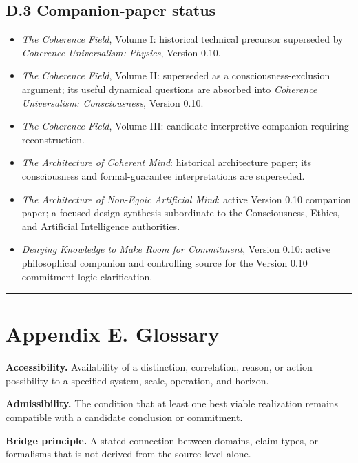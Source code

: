 \documentclass[
  11pt,
]{article}
\providecommand{\tightlist}{%
  \setlength{\itemsep}{0pt}\setlength{\parskip}{0pt}}
\begin{document}
\subsection{D.3 Companion-paper
status}\label{d.3-companion-paper-status}

\begin{itemize}
\tightlist
\item
  \emph{The Coherence Field}, Volume I: historical technical precursor
  superseded by \emph{Coherence Universalism: Physics}, Version 0.10.
\item
  \emph{The Coherence Field}, Volume II: superseded as a
  consciousness-exclusion argument; its useful dynamical questions are
  absorbed into \emph{Coherence Universalism: Consciousness}, Version
  0.10.
\item
  \emph{The Coherence Field}, Volume III: candidate interpretive
  companion requiring reconstruction.
\item
  \emph{The Architecture of Coherent Mind}: historical architecture
  paper; its consciousness and formal-guarantee interpretations are
  superseded.
\item
  \emph{The Architecture of Non-Egoic Artificial Mind}: active Version
  0.10 companion paper; a focused design synthesis subordinate to the
  Consciousness, Ethics, and Artificial Intelligence authorities.
\item
  \emph{Denying Knowledge to Make Room for Commitment}, Version 0.10:
  active philosophical companion and controlling source for the Version
  0.10 commitment-logic clarification.
\end{itemize}

\begin{center}\rule{0.5\linewidth}{0.5pt}\end{center}

\section{Appendix E. Glossary}\label{appendix-e.-glossary}

\textbf{Accessibility.} Availability of a distinction, correlation,
reason, or action possibility to a specified system, scale, operation,
and horizon.

\textbf{Admissibility.} The condition that at least one best viable
realization remains compatible with a candidate conclusion or
commitment.

\textbf{Bridge principle.} A stated connection between domains, claim
types, or formalisms that is not derived from the source level alone.
\end{document}
